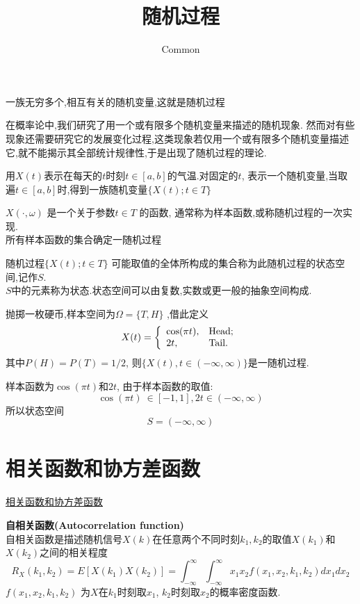 \documentclass{article}
\begin{document}
\title{随机过程}
\author{Common}

一族无穷多个,相互有关的随机变量,这就是随机过程

在概率论中,我们研究了用一个或有限多个随机变量来描述的随机现象.
然而对有些现象还需要研究它的发展变化过程,这类现象若仅用一个或有限多个随机变量描述它,就不能揭示其全部统计规律性,于是出现了随机过程的理论.
\begin{example}
用$X(t)$表示在每天的$t$时刻$t \in [a, b]$的气温.对固定的$t$,
表示一个随机变量,当取遍$t \in [a,b ]$时,得到一族随机变量$\{X(t); t \in T\}$
\end{example}

$X(\cdot, \omega)$ 是一个关于参数$t \in T$ 的函数, 通常称为样本函数,或称随机过程的一次实现.\\
所有样本函数的集合确定一随机过程

随机过程$\{X(t);t \in T\}$ 可能取值的全体所构成的集合称为此随机过程的状态空间,记作$S$.\\
$S$中的元素称为状态.状态空间可以由复数,实数或更一般的抽象空间构成.

\begin{example}
抛掷一枚硬币,样本空间为$\Omega = \{T, H\}$ ,借此定义
$$
X(t)=
\left\{
  \begin{array}{ll}
   \cos(\pi t) , & \hbox{Head;} \\
    2t, & \hbox{Tail.}
  \end{array}
\right.
$$
其中$P(H)=P(T)=1/2$, 则$\{X(t), t \in (-\infty, \infty)\}$是一随机过程.

样本函数为$\cos(\pi t)$和$2t$, 由于样本函数的取值:
$$\cos(\pi t)\ \in [-1,1], 2t \in (-\infty, \infty)$$
所以状态空间
$$S=(-\infty, \infty)$$
\end{example}

\section{相关函数和协方差函数}
\href{http://202.117.122.42:9001/xhxt/xhyxt/xuexi/chart9/c\_9\_3\_2\_001.htm}{相关函数和协方差函数}

\textbf{自相关函数(Autocorrelation function)}\\
自相关函数是描述随机信号$X(k)$在任意两个不同时刻$k_1,k_2$的取值$X(k_1) $和$X(k_2) $之间的相关程度
$$
R_X(k_1, k_2)
= E[X(k_1) X(k_2)]
= \int_{-\infty}^{\infty} \int_{-\infty}^{\infty} x_1 x_2 f(x_1, x_2, k_1, k_2)dx_1 dx_2
$$
$f(x_1, x_2, k_1, k_2)$ 为$X$在$k_1$时刻取$x_1$, $k_2$时刻取$x_2$的概率密度函数.
\end{document}
